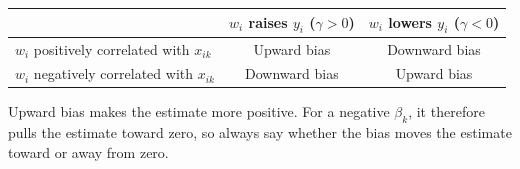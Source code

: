 \documentclass[12pt,a4paper]{article}
\begin{document}
\begin{center}
\begin{tabular}{@{}lcc@{}}
\toprule
 & \textbf{$w_i$ raises $y_i$ ($\gamma > 0$)} & \textbf{$w_i$ lowers $y_i$ ($\gamma < 0$)} \\
\midrule
$w_i$ positively correlated with $x_{ik}$ & Upward bias & Downward bias \\
$w_i$ negatively correlated with $x_{ik}$ & Downward bias & Upward bias \\
\bottomrule
\end{tabular}
\end{center}
 
Upward bias makes the estimate more positive. For a negative $\beta_k$, it therefore pulls the estimate toward zero, so always say whether the bias moves the estimate toward or away from zero.
\end{document}
